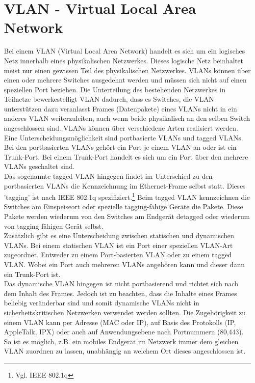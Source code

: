 \section{VLAN - Virtual Local Area Network}
\label{sec:vlan}

Bei einem VLAN (Virtual Local Area Network) handelt es sich um ein logisches Netz innerhalb eines physikalischen Netzwerkes. Dieses logische Netz beinhaltet meist nur einen gewissen Teil des physikalischen Netzwerkes. VLANs können über einen oder mehrere Switches ausgedehnt werden und müssen sich nicht auf einen speziellen Port beziehen. Die Unterteilung des bestehenden Netzwerkes in Teilnetze bewerkestelligt VLAN dadurch, dass es Switches, die VLAN unterstützen dazu veranlasst Frames (Datenpakete) eines VLANs nicht in ein anderes VLAN weiterzuleiten, auch wenn beide physikalisch an den selben Switch angeschlossen sind.
VLANs können über verschiedene Arten realisiert werden. Eine Unterscheidungsmöglichkeit sind portbasierte VLANs und tagged VLANs.
Bei den portbasierten VLANs gehört ein Port je einem VLAN an oder ist ein Trunk-Port. Bei einem Trunk-Port handelt es sich um ein Port über den mehrere VLANs geschaltet sind.\\
Das sogenannte tagged VLAN hingegen findet im Unterschied zu den portbasierten VLANs die Kennzeichnung im Ethernet-Frame selbst statt. Dieses 'tagging' ist nach IEEE 802.1q spezifiziert.\footnote{Vgl. IEEE 802.1q}
Beim tagged VLAN kennzeichnen die Switches am Einspeiseort oder spezielle tagging-fähige Geräte die Pakete. Diese Pakete werden wiederum von den Switches am Endgerät detagged oder wiederum von tagging fähigen Gerät selbst.\\
Zusätzlich gibt es eine Unterscheidung zwischen statischen und dynamischen VLANs.
Bei einem statischen VLAN ist ein Port einer speziellen VLAN-Art zugeordnet. Entweder zu einem Port-basierten VLAN oder zu einem tagged VLAN.
Wobei ein Port auch mehreren VLANs angehören kann und dieser dann ein Trunk-Port ist.\\
Das dynamische VLAN hingegen ist nicht portbasierend und richtet sich nach dem Inhalt des Frames. Jedoch ist zu beachten, dass die Inhalte eines Frames beliebig veränderbar sind und somit dynamische VLANs nicht in sicherheitskritischen Netzwerken verwendet werden sollten.
Die Zugehörigkeit zu einem VLAN kann per Adresse (MAC oder IP), auf Basis des Protokolls (IP, AppleTalk, IPX) oder auch auf Anwendungsebene nach Portnummern (80,443). So ist es möglich, z.B. ein mobiles Endgerät im Netzwerk immer dem gleichen VLAN zuordnen zu lassen, unabhängig an welchem Ort dieses angeschlossen ist.\\
